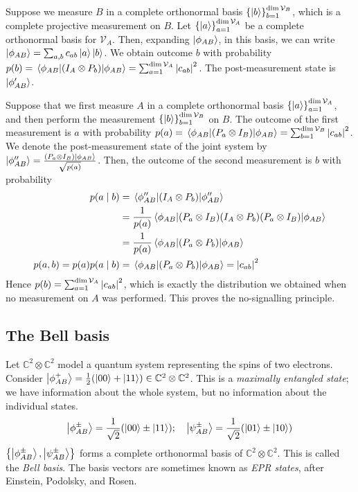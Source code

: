 Suppose we measure \( B \) in a complete orthonormal basis \( \qty{\ket{b}}_{b=1}^{\dim \mathcal V_B} \), which is a complete projective measurement on \( B \).
Let \( \qty{\ket{a}}_{a=1}^{\dim \mathcal V_A} \) be a complete orthonormal basis for \( \mathcal V_A \).
Then, expanding \( \ket{\phi_{AB}} \), in this basis, we can write \( \ket{\phi_{AB}} = \sum_{a,b} c_{ab} \ket{a} \ket{b} \).
We obtain outcome \( b \) with probability \( p(b) = \ev{\qty(I_A \otimes P_b)}{\phi_{AB}} = \sum_{a=1}^{\dim \mathcal V_A} \abs{c_{ab}}^2 \).
The post-measurement state is \( \ket{\phi_{AB}'} \).

Suppose that we first measure \( A \) in a complete orthonormal basis \( \qty{\ket{a}}_{a=1}^{\dim \mathcal V_A} \), and then perform the measurement \( \qty{\ket{b}}_{b=1}^{\dim \mathcal V_B} \) on \( B \).
The outcome of the first measurement is \( a \) with probability \( p(a) = \ev{\qty(P_a \otimes I_B)}{\phi_{AB}} = \sum_{b=1}^{\dim \mathcal V_B} \abs{c_{ab}}^2 \).
We denote the post-measurement state of the joint system by \( \ket{\phi_{AB}''}= \frac{(P_a \otimes I_B) \ket{\phi_{AB}}}{\sqrt{p(a)}} \).
Then, the outcome of the second measurement is \( b \) with probability
\begin{align*}
    p(a \mid b) &= \ev{\qty(I_A \otimes P_b)}{\phi_{AB}''} \\
    &= \frac{1}{p(a)} \ev{(P_a \otimes I_B) (I_A \otimes P_b) (P_a \otimes I_B)}{\phi_{AB}} \\
    &= \frac{1}{p(a)} \ev{(P_a \otimes P_b)}{\phi_{AB}} \\
    p(a,b) = p(a) p(a \mid b) &= \ev{(P_a \otimes P_b)}{\phi_{AB}} = \abs{c_{ab}}^2
\end{align*}
Hence \( p(b) = \sum_{a=1}^{\dim \mathcal V_A} \abs{c_{ab}}^2 \), which is exactly the distribution we obtained when no measurement on \( A \) was performed.
This proves the no-signalling principle.

\subsection{The Bell basis}
Let \( \mathbb C^2 \otimes \mathbb C^2 \) model a quantum system representing the spins of two electrons.
Consider \( \ket{\phi_{AB}^+} = \frac{1}{2}\qty(\ket{00} + \ket{11}) \in \mathbb C^2 \otimes \mathbb C^2 \).
This is a \emph{maximally entangled state}; we have information about the whole system, but no information about the individual states.
\[ \ket{\phi_{AB}^\pm} = \frac{1}{\sqrt{2}} \qty(\ket{00} \pm \ket{11});\quad \ket{\psi_{AB}^\pm} = \frac{1}{\sqrt{2}} \qty(\ket{01} \pm \ket{10}) \]
\( \qty{\ket{\phi_{AB}^\pm}, \ket{\psi_{AB}^\pm}} \) forms a complete orthonormal basis of \( \mathbb C^2 \otimes \mathbb C^2 \).
This is called the \emph{Bell basis}.
The basis vectors are sometimes known as \emph{EPR states}, after Einstein, Podolsky, and Rosen.

